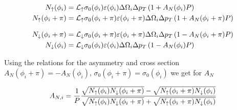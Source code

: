 \documentclass[12pt]{article}
\begin{document}
\begin{align}
N_\uparrow(\phi_i)       &= {\cal L_\uparrow}
   \sigma_{0}(\phi_i) \varepsilon(\phi_i)    \Delta\Omega_i \Delta p_T \left( 1 + A_{N}(\phi_i) P \right) \\
%
N_\uparrow(\phi_i+\pi)       &= {\cal L_\uparrow}
   \sigma_{0}(\phi_i+\pi) \varepsilon(\phi_i+\pi)    \Delta\Omega_i \Delta p_T \left( 1 + A_{N}(\phi_i+\pi) P \right)
\end{align}


\begin{align}
N_\downarrow(\phi_i+\pi) &= {\cal L_\downarrow}
   \sigma_{0}(\phi_i+\pi) \varepsilon(\phi_i+\pi) \Delta\Omega_i \Delta p_T \left( 1 - A_{N}(\phi_i+\pi) P \right) \\
%
N_\downarrow(\phi_i) &= {\cal L_\downarrow}
   \sigma_{0}(\phi_i) \varepsilon(\phi_i) \Delta\Omega_i \Delta p_T \left( 1 - A_{N}(\phi_i) P \right)
\end{align}


Using the relations for the asymmetry and cross section $A_{N}(\phi_i+\pi) =
-A_{N}(\phi_i)$, $\sigma_0(\phi_i+\pi) = \sigma_0(\phi_i)$ we get for $A_N$


\begin{align}
A_{N, i} = \frac{1}{P} \frac{%
\sqrt{N_{\uparrow}(\phi_i)N_{\downarrow}(\phi_i+\pi)} -
\sqrt{N_{\uparrow}(\phi_i+\pi)N_{\downarrow}(\phi_i)}
}{%
\sqrt{N_{\uparrow}(\phi_i)N_{\downarrow}(\phi_i+\pi)} +
\sqrt{N_{\uparrow}(\phi_i+\pi)N_{\downarrow}(\phi_i)}
}
\label{eq:asym_sqrt}
\end{align}

\newpage
\end{document}
